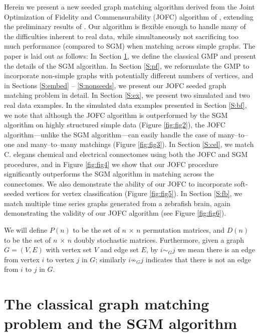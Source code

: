 \documentclass[12pt]{article}
\numberwithin{equation}{section}
\theoremstyle{definition}
\begin{document}
Herein we present a new seeded graph matching algorithm derived from the Joint
Optimization of Fidelity and Commensurability (JOFC) algorithm of
\cite{JOFC},
extending the preliminary results of \cite{adali2014joint}.
Our algorithm is flexible enough to handle many of the
difficulties
inherent to real data, while simultaneously not sacrificing too much
performance (compared to SGM) when matching across simple graphs.  The
paper is laid out as follows: In Section \ref{S:SGM}, we define the
classical GMP and present the details of the SGM algorithm. 
In Section
\ref{S:pf}, we reformulate the GMP to incorporate non-simple graphs with
potentially different numbers of vertices, and in Sections \ref{S:embed}
-- \ref{S:nonseeds}, we present our JOFC seeded graph matching problem
in detail.
 In Section \ref{S:ex}, we present two simulated and two real
data examples. In the simulated data examples presented in Section
\ref{S:bf}, we note that although the JOFC algorithm is outperformed by
the SGM algorithm on highly structured simple data (Figure
\ref{fig:fig2}), the JOFC algorithm---unlike the SGM algorithm---can
easily handle the case of many--to--one and many--to--many matchings
(Figure \ref{fig:fig3}).
 In Section \ref{S:cel}, we match C. elegans
chemical and electrical connectomes using both the JOFC and SGM
procedures, and in Figure \ref{fig:fig4} we show that our JOFC procedure
significantly outperforms the SGM algorithm in matching across the
connectomes.  We also demonstrate the ability of our JOFC to incorporate
soft-seeded vertices for vertex classification (Figure
\ref{fig:fig5}).
 In Section \ref{S:fb}, we match multiple time series
graphs generated from a zebrafish brain, again demonstrating the
validity of our JOFC algorithm (see Figure \ref{fig:fig6}).


  We will define $P(n)$ to be the set of $n$
$\times$ $n$ permutation matrices, and $D(n)$ to be the set of $n$
$\times$ $n$ doubly stochastic matrices. Furthermore, given a graph $G =
(V,E)$ with vertex set $V$ and edge set $E$, by $i\sim_G j$ we mean
there is an edge from vertex $i$ to vertex $j$ in $G$; similarly $i
\not\sim_G j$ indicates that there is not an edge from $i$ to $j$ in
$G$.


\section{The classical graph matching problem and the SGM algorithm}\label{S:SGM}
\end{document}
